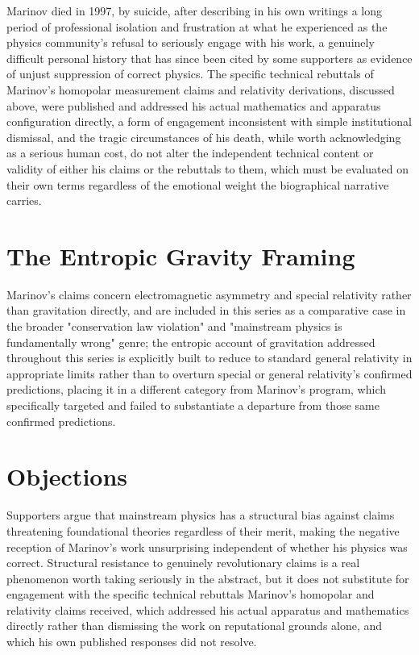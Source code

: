 \documentclass[11pt]{article}
\begin{document}
Marinov died in 1997, by suicide, after describing in his own writings a long period of professional isolation and frustration at what he experienced as the physics community's refusal to seriously engage with his work, a genuinely difficult personal history that has since been cited by some supporters as evidence of unjust suppression of correct physics. The specific technical rebuttals of Marinov's homopolar measurement claims and relativity derivations, discussed above, were published and addressed his actual mathematics and apparatus configuration directly, a form of engagement inconsistent with simple institutional dismissal, and the tragic circumstances of his death, while worth acknowledging as a serious human cost, do not alter the independent technical content or validity of either his claims or the rebuttals to them, which must be evaluated on their own terms regardless of the emotional weight the biographical narrative carries.

\section{The Entropic Gravity Framing}

Marinov's claims concern electromagnetic asymmetry and special relativity rather than gravitation directly, and are included in this series as a comparative case in the broader "conservation law violation" and "mainstream physics is fundamentally wrong" genre; the entropic account of gravitation addressed throughout this series is explicitly built to reduce to standard general relativity in appropriate limits rather than to overturn special or general relativity's confirmed predictions, placing it in a different category from Marinov's program, which specifically targeted and failed to substantiate a departure from those same confirmed predictions.

\section{Objections}

Supporters argue that mainstream physics has a structural bias against claims threatening foundational theories regardless of their merit, making the negative reception of Marinov's work unsurprising independent of whether his physics was correct. Structural resistance to genuinely revolutionary claims is a real phenomenon worth taking seriously in the abstract, but it does not substitute for engagement with the specific technical rebuttals Marinov's homopolar and relativity claims received, which addressed his actual apparatus and mathematics directly rather than dismissing the work on reputational grounds alone, and which his own published responses did not resolve.
\end{document}
